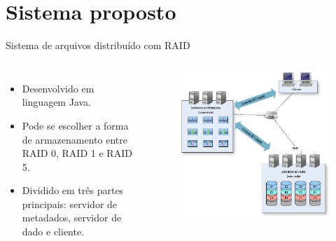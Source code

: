 \section{Sistema proposto}
\begin{frame}{Sistema de arquivos distribuído com RAID}
	
	\begin{columns}
		\begin{itemize}
			\item Desenvolvido em linguagem Java.
			\item Pode se escolher a forma de armazenamento entre RAID 0, RAID 1 e RAID 5.
		
			\item Dividido em três partes principais: servidor de metadados, servidor de dado e cliente.
		\end{itemize}
		
		\begin{figure}
			\includegraphics[width=\textwidth]{imagens/visao_geral}
		\end{figure}
	\end{columns}
	
\end{frame}


